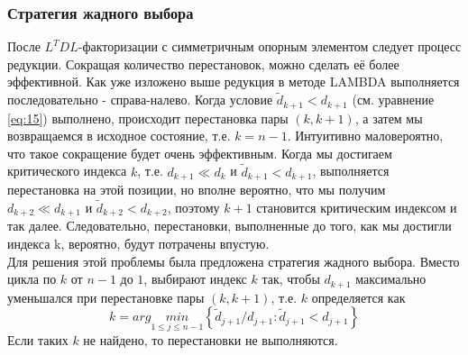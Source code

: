 \documentclass[12pt]{matmex-diploma}
\begin{document}
\subsubsection{Стратегия жадного выбора}
После $L^TDL$-факторизации с симметричным опорным элементом следует процесс редукции.
Сокращая количество перестановок, можно сделать её более эффективной.
Как уже изложено выше редукция в методе LAMBDA выполняется последовательно - 
справа-налево. Когда условие $\tilde{d}_{k + 1} < d_{k + 1}$ 
(см. уравнение \ref{eq:15}) выполнено, происходит перестановка пары $(k, k + 1)$,
а затем мы возвращаемся в исходное состояние, т.е. $k = n - 1$. Интуитивно
маловероятно, что такое сокращение будет очень эффективным. Когда мы достигаем
критического индекса $k$, т.е. $d_{k + 1} \ll d_k$ и $\tilde{d}_{k + 1} < d_{k + 1}$,
выполняется перестановка на этой позиции, но вполне вероятно, что мы получим
$d_{k + 2} \ll d_{k + 1}$ и $\tilde{d}_{k + 2} < d_{k + 2}$, поэтому $k + 1$
становится критическим индексом и так далее. Следовательно, перестановки, 
выполненные до того, как мы достигли индекса k, вероятно, будут потрачены впустую. \\
Для решения этой проблемы была предложена стратегия жадного выбора. Вместо цикла
по $k$ от $n − 1$ до $1$, выбирают индекс $k$ так, чтобы $d_{k + 1}$ максимально 
уменьшался при перестановке пары $(k, k + 1)$, т.е. $k$ определяется как
\begin{equation}
     k = arg \underset{1 \leq j \leq n-1}{min} 
     \left\{ \tilde{d}_{j+1} / d_{j+1} : \tilde{d}_{j+1} < d_{j+1} \right\}
     \label{eq:25}
\end{equation}
Если таких $k$ не найдено, то перестановки не выполняются.
\end{document}
